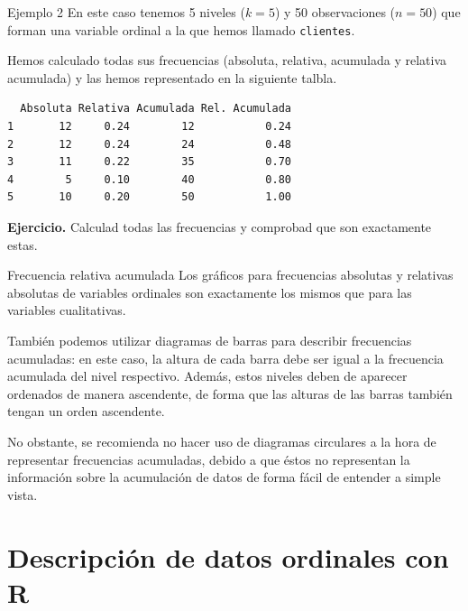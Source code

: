 \documentclass[
  ignorenonframetext,
]{beamer}
\begin{document}
\begin{frame}[fragile]{Ejemplo 2}
\label{ejemplo-2-3}
En este caso tenemos 5 niveles (\(k=5\)) y 50 observaciones (\(n=50\))
que forman una variable ordinal a la que hemos llamado
\texttt{clientes}.

Hemos calculado todas sus frecuencias (absoluta, relativa, acumulada y
relativa acumulada) y las hemos representado en la siguiente talbla.

\begin{verbatim}
  Absoluta Relativa Acumulada Rel. Acumulada
1       12     0.24        12           0.24
2       12     0.24        24           0.48
3       11     0.22        35           0.70
4        5     0.10        40           0.80
5       10     0.20        50           1.00
\end{verbatim}

\textbf{Ejercicio.} Calculad todas las frecuencias y comprobad que son
exactamente estas.
\end{frame}

\begin{frame}{Frecuencia relativa acumulada}
\label{frecuencia-relativa-acumulada-7}
Los gráficos para frecuencias absolutas y relativas absolutas de
variables ordinales son exactamente los mismos que para las variables
cualitativas.

También podemos utilizar diagramas de barras para describir frecuencias
acumuladas: en este caso, la altura de cada barra debe ser igual a la
frecuencia acumulada del nivel respectivo. Además, estos niveles deben
de aparecer ordenados de manera ascendente, de forma que las alturas de
las barras también tengan un orden ascendente.

No obstante, se recomienda no hacer uso de diagramas circulares a la
hora de representar frecuencias acumuladas, debido a que éstos no
representan la información sobre la acumulación de datos de forma fácil
de entender a simple vista.
\end{frame}

\section{Descripción de datos ordinales con
R}\label{descripciuxf3n-de-datos-ordinales-con-r-1}
\end{document}
